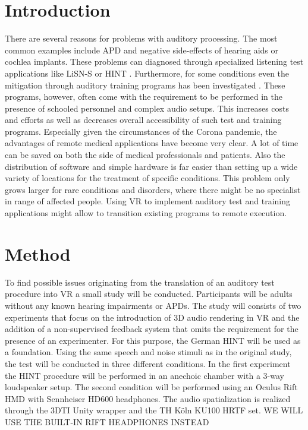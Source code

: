 \documentclass[a4paper,11pt]{article}%
\renewcommand{\\}{\vspace*{0.5\baselineskip} \newline}
\begin{document}
\section{Introduction}
There are several reasons for problems with auditory processing. The most common examples include \ac{APD} and negative side-effects of hearing aids or cochlea implants. These problems can diagnosed through specialized listening test applications like \ac{LiSN-S} \cite{Cameron2007} or \ac{HINT} \cite{Nilsson1994}. Furthermore, for some conditions even the mitigation through auditory training programs has been investigated \cite{Tyler2010}\cite{Cameron2011}. These programs, however, often come with the requirement to be performed in the presence of schooled personnel and complex audio setups. This increases costs and efforts as well as decreases overall accessibility of such test and training programs. Especially given the circumstances of the Corona pandemic, the advantages of remote medical applications have become very clear. A lot of time can be saved on both the side of medical professionals and patients. Also the distribution of software and simple hardware is far easier than setting up a wide variety of locations for the treatment of specific conditions. This problem only grows larger for rare conditions and disorders, where there might be no specialist in range of affected people. Using \ac{VR} to implement auditory test and training applications might allow to transition existing programs to remote execution.


\section{Method}
To find possible issues originating from the translation of an auditory test procedure into \ac{VR} a small study will be conducted. Participants will be adults without any known hearing impairments or \ac{APD}s. The study will consists of two experiments that focus on the introduction of 3D audio rendering in \ac{VR} and the addition of a non-supervised feedback system that omits the requirement for the presence of an experimenter.
\newline
\newline
For this purpose, the German \ac{HINT} will be used as a foundation. Using the same speech and noise stimuli as in the original study, the test will be conducted in three different conditions. In the first experiment the \ac{HINT} procedure will be performed in an anechoic chamber with a 3-way loudspeaker setup. The second condition will be performed using an Oculus Rift \ac{HMD} with Sennheiser HD600 headphones. The audio spatialization is realized through the \ac{3DTI} Unity wrapper and the TH Köln KU100 \ac{HRTF} set.
\newline
\newline
WE WILL USE THE BUILT-IN RIFT HEADPHONES INSTEAD
\end{document}
